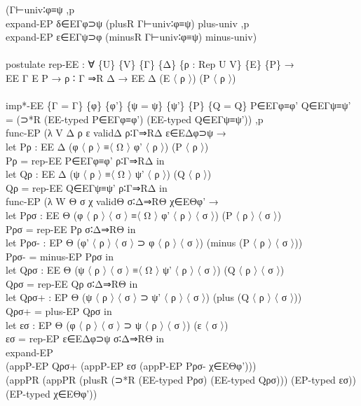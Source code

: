 {\begin{code}
{\>      (Γ⊢univ∶φ≡ψ ,p \<\\
\>      expand-EP δ∈EΓφ⊃ψ (plusR Γ⊢univ∶φ≡ψ) plus-univ ,p \<\\
\>      expand-EP ε∈EΓψ⊃φ (minusR Γ⊢univ∶φ≡ψ) minus-univ)\<\\
\>\<\\
\>postulate rep-EE : ∀ \{U\} \{V\} \{Γ\} \{Δ\} \{ρ : Rep U V\} \{E\} \{P\} →\<\\
\>                 EE Γ E P → ρ ∶ Γ ⇒R Δ → EE Δ (E 〈 ρ 〉) (P 〈 ρ 〉)\<\\
\>\<\\
\>imp*-EE \{Γ = Γ\} \{φ\} \{φ'\} \{ψ = ψ\} \{ψ'\} \{P\} \{Q = Q\} P∈EΓφ≡φ' Q∈EΓψ≡ψ' = (⊃*R (EE-typed P∈EΓφ≡φ') (EE-typed Q∈EΓψ≡ψ')) ,p \<\\
\>  func-EP (λ V Δ ρ ε validΔ ρ∶Γ⇒RΔ ε∈EΔφ⊃ψ →\<\\
\>    let Pρ : EE Δ (φ 〈 ρ 〉 ≡〈 Ω 〉 φ' 〈 ρ 〉) (P 〈 ρ 〉)\<\\
\>        Pρ = rep-EE P∈EΓφ≡φ' ρ∶Γ⇒RΔ in\<\\
\>    let Qρ : EE Δ (ψ 〈 ρ 〉 ≡〈 Ω 〉 ψ' 〈 ρ 〉) (Q 〈 ρ 〉)\<\\
\>        Qρ = rep-EE Q∈EΓψ≡ψ' ρ∶Γ⇒RΔ in\<\\
\>    func-EP (λ W Θ σ χ validΘ σ∶Δ⇒RΘ χ∈EΘφ' → \<\\
\>    let Pρσ : EE Θ (φ 〈 ρ 〉 〈 σ 〉 ≡〈 Ω 〉 φ' 〈 ρ 〉 〈 σ 〉) (P 〈 ρ 〉 〈 σ 〉)\<\\
\>        Pρσ = rep-EE Pρ σ∶Δ⇒RΘ in\<\\
\>    let Pρσ- : EP Θ (φ' 〈 ρ 〉 〈 σ 〉 ⊃ φ 〈 ρ 〉 〈 σ 〉) (minus (P 〈 ρ 〉 〈 σ 〉))\<\\
\>        Pρσ- = minus-EP Pρσ in\<\\
\>    let Qρσ : EE Θ (ψ 〈 ρ 〉 〈 σ 〉 ≡〈 Ω 〉 ψ' 〈 ρ 〉 〈 σ 〉) (Q 〈 ρ 〉 〈 σ 〉)\<\\
\>        Qρσ = rep-EE Qρ σ∶Δ⇒RΘ in\<\\
\>    let Qρσ+ : EP Θ (ψ 〈 ρ 〉 〈 σ 〉 ⊃ ψ' 〈 ρ 〉 〈 σ 〉) (plus (Q 〈 ρ 〉 〈 σ 〉))\<\\
\>        Qρσ+ = plus-EP Qρσ in\<\\
\>    let εσ : EP Θ (φ 〈 ρ 〉 〈 σ 〉 ⊃ ψ 〈 ρ 〉 〈 σ 〉) (ε 〈 σ 〉)\<\\
\>        εσ = rep-EP ε∈EΔφ⊃ψ σ∶Δ⇒RΘ in\<\\
\>    expand-EP \<\\
\>    (appP-EP Qρσ+ (appP-EP εσ (appP-EP Pρσ- χ∈EΘφ')))\<\\
\>    (appPR (appPR (plusR (⊃*R (EE-typed Pρσ) (EE-typed Qρσ))) (EP-typed εσ)) (EP-typed χ∈EΘφ')) \<\\
}
\end{code}}
